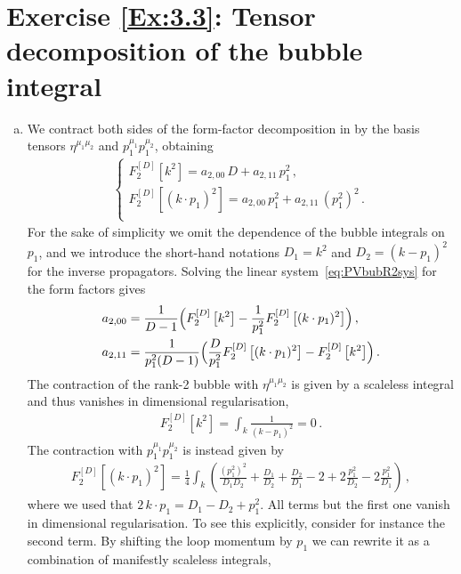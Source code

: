 \section*{Exercise \ref{Ex:3.3}: Tensor decomposition of the bubble integral}
\label{Sol:3.3}
\begin{enumerate}[a)]
\item We contract both sides of the form-factor decomposition in  by the basis tensors $\eta^{\mu_1 \mu_2}$ and $p_1^{\mu_1} p_1^{\mu_2}$, obtaining
\begin{align} \label{eq:PVbubR2sys}
\begin{cases}
F_2^{[D]} \left[k^2 \right] = a_{2,00} \, D + a_{2,11} \, p_1^2 \,, \\
F_2^{[D]}\left[(k\cdot p_1)^2 \right]  = a_{2,00} \, p_1^2 + a_{2,11} \, (p_1^2)^2 \,. \\
\end{cases}
\end{align}
For the sake of simplicity we omit the dependence of the bubble integrals on $p_1$, and we introduce the short-hand notations $D_1=k^2$ and $D_2 = (k-p_1)^2$ for the inverse propagators.
Solving the linear system~\eqref{eq:PVbubR2sys} for the form factors gives
\begin{align} \label{eq:PVbubR2sol1}
\begin{aligned}
a_{2,00} & = \frac{1}{D-1} \Bigl( F_2^{[D]}\left[k^2 \right] - \frac{1}{p_1^2} F_2^{[D]}\left[(k\cdot p_1)^2 \right] \Bigr) \,, \\
a_{2,11} & = \frac{1}{p_1^2 (D-1)} \Bigl( \frac{D}{p_1^2}  F_2^{[D]}\left[(k\cdot p_1)^2 \right] - F_2^{[D]}\left[k^2 \right]\Bigr) \,.
\end{aligned}
\end{align}
The contraction of the rank-2 bubble with $\eta^{\mu_1\mu_2}$ is given by a scaleless integral and thus vanishes in dimensional regularisation,
\begin{align} \label{eq:I2dotgfin}
F_2^{[D]}\left[ k^2 \right] = \int_k \frac{1}{(k-p_1)^2} = 0 \,.
\end{align}
The contraction with $p_1^{\mu_1} p_1^{\mu_2}$ is instead given by
\begin{align} \label{eq:I2dotp1p1}
F_2^{[D]}\left[ (k\cdot p_1)^2 \right] = 
  \frac{1}{4} \int_k \left( \frac{(p_1^2)^2}{D_1 D_2} + \frac{D_1}{D_2} + \frac{D_2}{D_1} - 2 + 2 \frac{p_1^2}{D_2} - 2 \frac{p_1^2}{D_1} \right) \,,
\end{align}
where we used that $2\, k\cdot p_1 = D_1 - D_2 + p_1^2$. All terms but the first one vanish in dimensional regularisation. To see this explicitly, consider for instance the second term. By shifting the loop momentum by $p_1$ we can rewrite it as a combination of manifestly scaleless integrals,

\end{enumerate}
